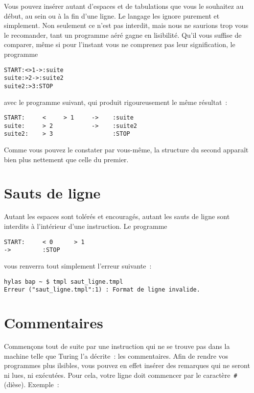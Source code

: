 \documentclass[a4paper, 11pt]{report}
\begin{document}
Vous pouvez insérer autant d'espaces et de tabulations que vous le
souhaitez au début, au sein ou à la fin d'une ligne. Le langage les
ignore purement et simplement. Non seulement ce n'est pas interdit, mais
nous ne saurions trop vous le recomander, tant un programme aéré gagne
en lisibilité. Qu'il vous suffise de comparer, même si pour l'instant
vous ne comprenez pas leur signification, le programme

\begin{verbatim}
START:<>1->:suite
suite:>2->:suite2
suite2:>3:STOP
\end{verbatim}

\noindent avec le programme suivant, qui produit rigoureusement le même
résultat~:

\begin{verbatim}
START:     <     > 1     ->    :suite
suite:     > 2           ->    :suite2
suite2:    > 3                 :STOP
\end{verbatim}

Comme vous pouvez le constater par vous-même, la structure du second
apparaît bien plus nettement que celle du premier.

\par

\section{Sauts de ligne}

Autant les espaces sont tolérés et encouragés, autant les sauts de ligne
sont interdits à l'intérieur d'une instruction. Le programme

\begin{verbatim}
START:     < 0      > 1
->         :STOP
\end{verbatim}

vous renverra tout simplement l'erreur suivante~:

\begin{verbatim}
hylas bap ~ $ tmpl saut_ligne.tmpl
Erreur ("saut_ligne.tmpl":1) : Format de ligne invalide.
\end{verbatim}

\section{Commentaires}

Commençons tout de suite par une instruction qui ne se trouve pas dans
la machine telle que Turing l'a décrite~: les commentaires. Afin de
rendre vos programmes plus ilsibles, vous pouvez en effet insérer des
remarques qui ne seront ni lues, ni exécutées. Pour cela, votre ligne
doit commencer par le caractère~\texttt{\#} (dièse). Exemple~:
\end{document}

